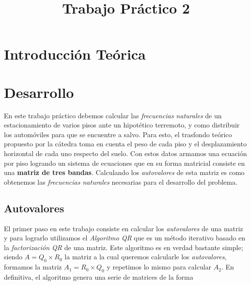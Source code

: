 \documentclass[a4paper]{article}
\title{Trabajo Práctico 2}
\begin{document}

\resumen{}

\maketitle

\newpage

\tableofcontents


\newpage

\section{Introducción Teórica}


\section{Desarrollo}

En este trabajo práctico debemos calcular las \textit{frecuencias naturales} de un estacionamiento de varios pisos ante un hipotético terremoto, y como distribuir los automóviles para que se encuentre a salvo. Para esto, el trasfondo teórico propuesto por la cátedra toma en cuenta el peso de cada piso y el desplazamiento horizontal de cada uno respecto del suelo. Con estos datos armamos una ecuación por piso logrando un sistema de ecuaciones que en su forma matricial consiste en una \textbf{matriz de tres bandas}. Calculando los \textit{autovalores} de esta matriz es como obtenemos las \textit{frecuencias naturales} necesarias para el desarrollo del problema.

\subsection{Autovalores}
El primer paso en este trabajo consiste en calcular los \textit{autovalores} de una matriz y para lograrlo utilizamos el \textit{Algoritmo QR} que es un método iterativo basado en la \textit{factorización QR} de una matriz. Este algoritmo es en verdad bastante simple; siendo $A = Q_0 \times R_0$ la matriz a la cual queremos calcularle los \textit{autovalores}, formamos la matriz $A_1 = R_0 \times Q_0$ y repetimos lo mismo para calcular $A_2$. En definitiva, el algoritmo genera una serie de matrices de la forma
\end{document}

